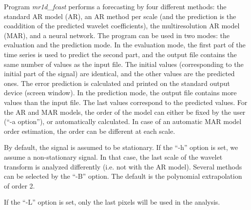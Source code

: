 Program {\em mr1d\_fcast} performs a forecasting by four different methods:
the standard AR model (AR), an AR method per scale (and the prediction
is the coaddition of the predicted wavelet coefficients), 
the multiresolution AR model (MAR), and a neural network.
The program can be used in two modes: the evaluation and the prediction 
mode. In the evaluation mode, the first part of the time series is used
to predict the second part, and the output file contains the same 
number of values as the input file. The initial values (corresponding to
the initial part of the signal) are identical, 
and the other values are the predicted ones. 
The error prediction is calculated
and printed on the standard output device (screen window). 
In the prediction mode,
the output file contains more values than the input file. The last values
correspond to the predicted values.
For the AR and MAR models, the order of the model can either be fixed 
by the user (``-a option''), or automatically calculated. 
In case of an automatic
MAR model order estimation, the order can be different at each scale.

By default, the signal is assumed to be stationary. 
If the ``-h'' option is set,
we assume a non-stationary signal. In that case, the last scale of the
wavelet transform is analyzed differently (i.e. not with the AR model).
Several methods can be selected by the ``-B'' option. 
The default is the polynomial extrapolation of order 2.

If the ``-L'' option is set, only the last pixels will be used in the
analysis.

